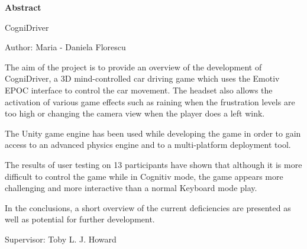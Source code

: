 \vspace*{\fill}

\begin{center}
	\Large
	\vspace{0.9cm}
    \textbf{Abstract}
    
    CogniDriver
    
    Author: Maria - Daniela Florescu    
\end{center}

The aim of the project is to provide an overview of the development of CogniDriver, a 3D mind-controlled car driving game which uses the Emotiv EPOC interface to control the car movement. The headset also allows the activation of various game effects such as raining when the frustration levels are too high or changing the camera view when the player does a left wink.

The Unity game engine has been used while developing the game in order to gain access to an advanced physics engine and to a multi-platform deployment tool.

The results of user testing on 13 participants have shown that although it is more difficult to control the game while in Cognitiv mode, the game appears more challenging and more interactive than a normal Keyboard mode play. 

In the conclusions, a short overview of the current deficiencies are presented as well as potential for further development.

\begin{center}  
	\Large  
    Supervisor: Toby L. J. Howard
\end{center}

\vspace*{\fill}
